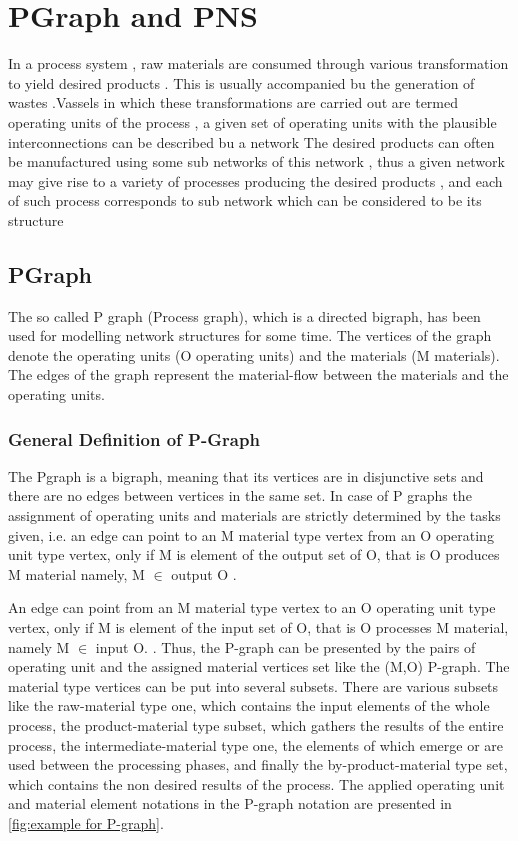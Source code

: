 
\chapter{\label{cha:pgraph}PGraph and PNS}

 
In a process system , raw materials are consumed through various transformation to yield desired products . 
This is usually accompanied bu the generation of wastes .Vassels in which these transformations are carried out are termed operating units of the process , a given set of operating units with the plausible interconnections can be described bu a network The desired products can often be manufactured using some sub networks of this network , thus a given network may give rise to a variety of processes producing the desired products , and each of such process corresponds to sub network which can be considered  to be its structure
\section{ PGraph }


The so called P graph (Process graph), which is a directed bigraph, has been used for modelling network structures for some time.
The vertices of the graph denote the operating units (O   operating units) and the materials (M   materials).
The edges of the graph represent the material-flow between the materials and the operating units.
\subsection{ General Definition of P-Graph }

The Pgraph is a bigraph, meaning that its vertices are in disjunctive sets and there are no edges between vertices in the same set.
In case of P graphs the assignment of operating units and materials are strictly determined by the tasks given, i.e. an edge can point to an M material type vertex from an O operating unit type vertex, only if M is element of the output set of O, that is O produces M material namely, M $\in$ output O . 


An edge can point from an M material type vertex to an O operating unit type vertex, only if M is element of the input set of O, that is O processes M material, namely M  $\in$ input O. .
Thus, the P-graph can be presented by the pairs of operating unit and the assigned material vertices set like the (M,O) P-graph.
The material type vertices can be put into several subsets. 
There are various subsets like the raw-material type one, which contains the input elements of the whole process, the product-material type subset, which gathers the results of the entire process, the intermediate-material type one, the elements of which emerge or are used between the processing phases, and finally the by-product-material  type set, which contains the non desired results of the process. The applied operating unit and material element notations in the P-graph notation are presented in \ref{fig:example for P-graph}.

